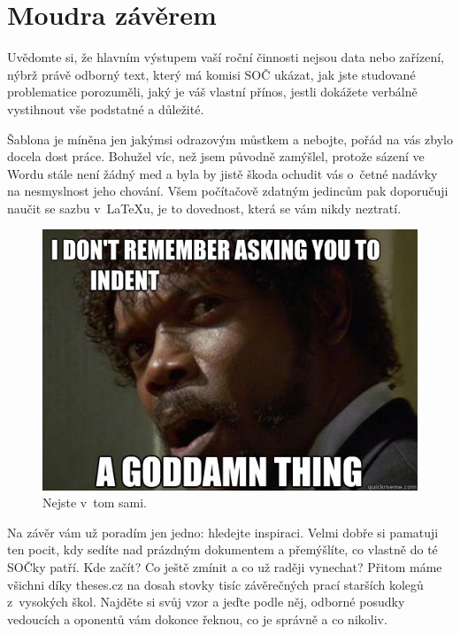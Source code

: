 \documentclass{template/socthesis}
\begin{document}
\section{Moudra závěrem}
Uvědomte si, že hlavním výstupem vaší roční činnosti nejsou data nebo zařízení, nýbrž právě odborný text, který má komisi SOČ ukázat, jak jste studované problematice porozuměli, jaký je váš vlastní přínos, jestli dokážete verbálně vystihnout vše podstatné a důležité.

Šablona je míněna jen jakýmsi odrazovým můstkem a nebojte, pořád na vás zbylo docela dost práce.
Bohužel víc, než jsem původně zamýšlel, protože sázení ve Wordu stále není žádný med a byla by jistě škoda ochudit vás o~četné nadávky na nesmyslnost jeho chování.
Všem počítačově zdatným jedincům pak doporučuji naučit se sazbu v~LaTeXu, je to dovednost, která se vám nikdy neztratí.

\begin{figure}[h]
  	\centering
 	\includegraphics[width=\textwidth]{img/pulp.jpg}
 	\caption{Nejste v~tom sami.}
\end{figure}

Na závěr vám už poradím jen jedno: hledejte inspiraci.
Velmi dobře si pamatuji ten pocit, kdy sedíte nad prázdným dokumentem a přemýšlíte, co vlastně do té SOČky patří.
Kde začít? Co ještě zmínit a co už raději vynechat? Přitom máme všichni díky theses.cz na dosah stovky tisíc závěrečných prací starších kolegů z~vysokých škol.
Najděte si svůj vzor a jeďte podle něj, odborné posudky vedoucích a oponentů vám dokonce řeknou, co je správně a co nikoliv.
\end{document}
